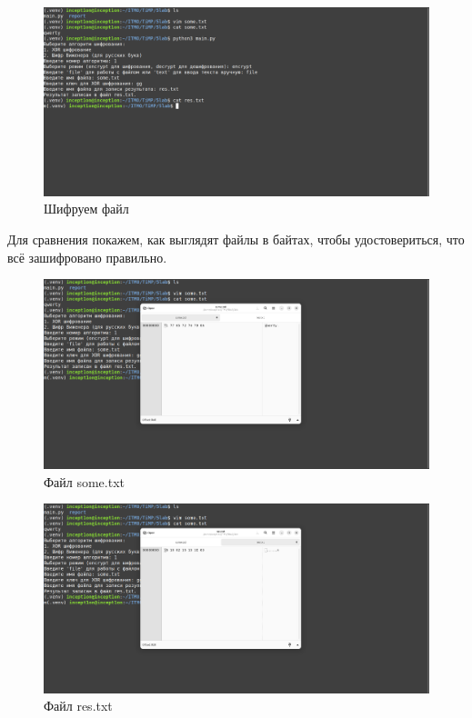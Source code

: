 \documentclass[a4paper, 12pt]{article}
\begin{document}
\begin{figure}[h!]
    \noindent
    \centering
    \includegraphics[width=1\linewidth]{pic_enc_xor.png}
    \caption{Шифруем файл}
\end{figure}

\newpage
Для сравнения покажем, как выглядят файлы в байтах, чтобы удостовериться, что всё зашифровано правильно. 

\begin{figure}[h!]
    \noindent
    \centering
    \includegraphics[width=1\linewidth]{pic_ghex_some.png}
    \caption{Файл some.txt}
\end{figure}

\begin{figure}[h!]
    \noindent
    \centering
    \includegraphics[width=1\linewidth]{pic_ghex_res.png}
    \caption{Файл res.txt}
\end{figure}
\end{document}
